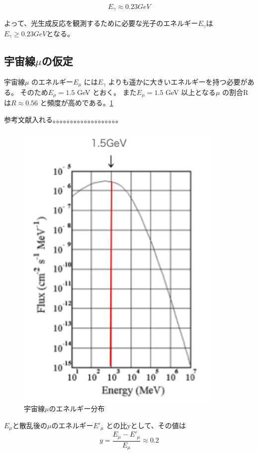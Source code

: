 \begin{equation}
    E_\gamma \approx 0.23 GeV
\end{equation}

よって、光生成反応を観測するために必要な光子のエネルギー$E_\gamma$は
$E_\gamma \geq 0.23 GeV$となる。

\subsection{宇宙線$\mu$の仮定}
宇宙線$\mu$ のエネルギー$E_\mu$ には$E_\gamma$ よりも遥かに大きいエネルギーを持つ必要がある。
そのため$E_\mu = 1.5$ GeV とおく。
また$E_\mu = 1.5$ GeV 以上となる$\mu$ の割合Rは$R \approx 0.56$ と頻度が高めである。\ref{fig:test3}

参考文献入れる。。。。。。。。。。。。。。。。。。。

\begin{figure}[H]
    \centering
    \includegraphics[width=10cm]{img/cosimic_ray_energy_distribution.png}
    \caption{宇宙線$\mu$のエネルギー分布}
    \label{fig:test3}
\end{figure}

$E_\mu$と散乱後の$\mu$のエネルギー$E'_\mu$ との比yとして、その値は
\begin{equation}
    y = \dfrac{E_\mu - E'_\mu}{E_\mu} \approx 0.2
\end{equation}

